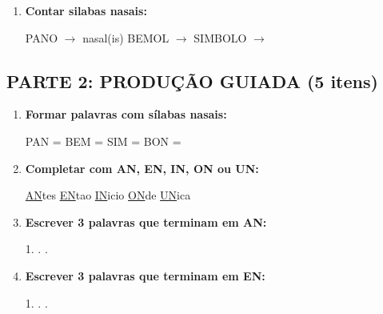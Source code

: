 \begin{exercicio}
\begin{enumerate}
  \item \textbf{Contar silabas nasais:}
  \begin{center}
  PANO $\rightarrow$ \underline{\hspace{1cm}} nasal(is) \quad BEMOL $\rightarrow$ \underline{\hspace{1cm}} \quad SIMBOLO $\rightarrow$ \underline{\hspace{1cm}}
  \end{center}
\end{enumerate}

\subsection*{PARTE 2: PRODUÇÃO GUIADA (5 itens)}

\begin{enumerate}[resume]
  \item \textbf{Formar palavras com sílabas nasais:}
  \begin{center}
  PAN = \underline{\hspace{2cm}} \quad BEM = \underline{\hspace{2cm}} \quad SIM = \underline{\hspace{2cm}} \quad BON = \underline{\hspace{2cm}}
  \end{center}

  \item \textbf{Completar com AN, EN, IN, ON ou UN:}
  \begin{center}
  \underline{AN}tes \quad \underline{EN}tao \quad \underline{IN}icio \quad \underline{ON}de \quad \underline{UN}ica
  \end{center}

  \item \textbf{Escrever 3 palavras que terminam em AN:}
  \begin{center}
  1. \underline{\hspace{3cm}} . \underline{\hspace{3cm}} . \underline{\hspace{3cm}}
  \end{center}

  \item \textbf{Escrever 3 palavras que terminam em EN:}
  \begin{center}
  1. \underline{\hspace{3cm}} . \underline{\hspace{3cm}} . \underline{\hspace{3cm}}
  \end{center}


\end{enumerate}
\end{exercicio}
